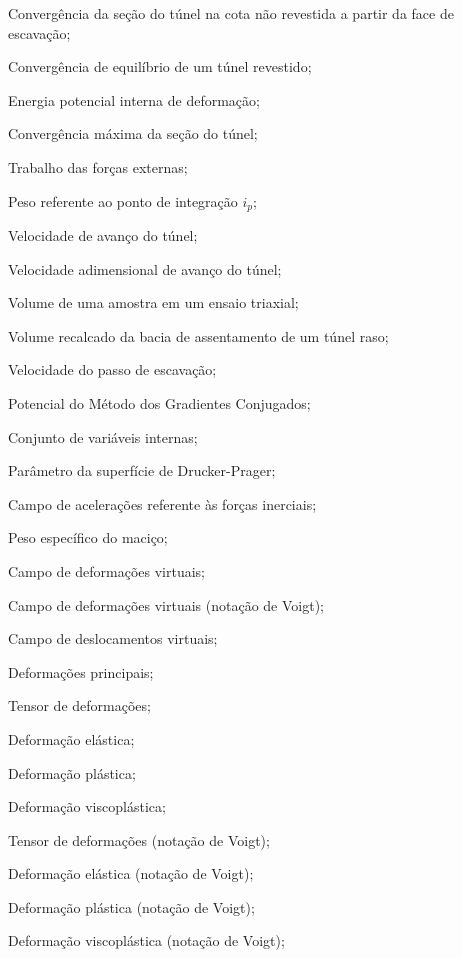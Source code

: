 \item[$ U_{0} $] 		Convergência da seção do túnel na cota não revestida a partir da face de escavação;
\item[$ U_{eq} $] 		Convergência de equilíbrio de um túnel revestido;
\item[$ U_{int} $] 		Energia potencial interna de deformação;
\item[$ U_{max} $] 		Convergência máxima da seção do túnel;
\item[$ W_{ext} $] 		Trabalho das forças externas;
\item[$ W_{i_p} $] 		Peso referente ao ponto de integração $i_p$;
\item[$ V $] 			Velocidade de avanço do túnel;
\item[$ V^* $] 			Velocidade adimensional de avanço do túnel;
\item[$ V_a $] 			Volume de uma amostra em um ensaio triaxial;
\item[$ V_{bacia} $]	Volume recalcado da bacia de assentamento de um túnel raso;
\item[$ V_{p} $]	Velocidade do passo de escavação;
\item[$V(\Delta \ul)$]	Potencial do Método dos Gradientes Conjugados;

\item[\textbf{Grego minúsculo:}]
\item[$\alphal$] Conjunto de variáveis internas;
\item[$\beta_1,\beta_2,\beta_3$] Parâmetro da superfície de Drucker-Prager;
\item[$ \gammal $] 		Campo de acelerações referente às forças inerciais;
\item[$\gamma_m$] 		Peso específico do maciço;
\item[$\dvarepsilonll$]		Campo de deformações virtuais;
\item[$\dvarepsilonl$]		Campo de deformações virtuais (notação de Voigt);
\item[$\dul$]		Campo de deslocamentos virtuais;
\item[$\varepsilon_1,\varepsilon_2,\varepsilon_3$] 	Deformações principais;
\item[$ \varepsilonll $] 	Tensor de deformações;
\item[$\varepsilonll^e$] Deformação elástica;
\item[$\varepsilonll^p$] Deformação plástica;
\item[$\varepsilonll^{vp}$] Deformação viscoplástica;
\item[$ \varepsilonl $] 	Tensor de deformações (notação de Voigt);
\item[$\varepsilonl^e$] Deformação elástica (notação de Voigt);
\item[$\varepsilonl^p$] Deformação plástica (notação de Voigt);
\item[$\varepsilonl^{vp}$] Deformação viscoplástica (notação de Voigt);

